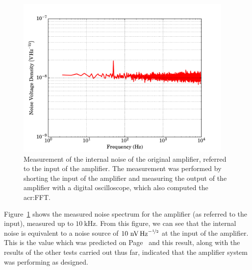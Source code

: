 \begin{figure}[t]
\begin{center}
\includegraphics[width = 0.95\textwidth]{figures/RTD_amp_IRN}
\caption[Input referred noise of original amplifier]{Measurement of the internal noise of the original amplifier, referred to the input of the amplifier. The measurement was performed by shorting the input of the amplifier and measuring the output of the amplifier with a digital oscilloscope, which also computed the \gls{acr:FFT}.}
\label{fig:RTD_amp_IRN}
\end{center}
\end{figure}
\par 
Figure~\ref{fig:RTD_amp_IRN} shows the measured noise spectrum for the amplifier (as referred to the input), measured up to $10~\mathrm{kHz}$. From this figure, we can see that the internal noise is equivalent to a noise source of $10~\mathrm{nV\,Hz}^{-\nicefrac{1}{2}}$ at the input of the amplifier. This is the value which was predicted on Page~\pageref{res:RTD_amp_noise} and this result, along with the results of the other tests carried out thus far, indicated that the amplifier system was performing as designed.

